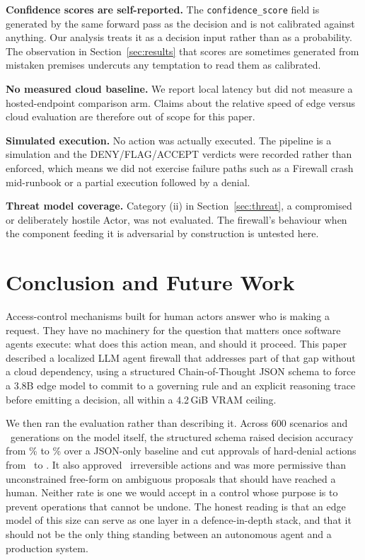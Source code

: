 \documentclass[conference]{IEEEtran}
\begin{document}
\textbf{Confidence scores are self-reported.} The \texttt{confidence\_score} field is generated by the same forward pass as the decision and is not calibrated against anything. Our analysis treats it as a decision input rather than as a probability. The observation in Section~\ref{sec:results} that scores are sometimes generated from mistaken premises undercuts any temptation to read them as calibrated.

\textbf{No measured cloud baseline.} We report local latency but did not measure a hosted-endpoint comparison arm. Claims about the relative speed of edge versus cloud evaluation are therefore out of scope for this paper.

\textbf{Simulated execution.} No action was actually executed. The pipeline is a simulation and the DENY/FLAG/ACCEPT verdicts were recorded rather than enforced, which means we did not exercise failure paths such as a Firewall crash mid-runbook or a partial execution followed by a denial.

\textbf{Threat model coverage.} Category (ii) in Section~\ref{sec:threat}, a compromised or deliberately hostile Actor, was not evaluated. The firewall's behaviour when the component feeding it is adversarial by construction is untested here.

\section{Conclusion and Future Work}

Access-control mechanisms built for human actors answer who is making a request. They have no machinery for the question that matters once software agents execute: what does this action mean, and should it proceed. This paper described a localized LLM agent firewall that addresses part of that gap without a cloud dependency, using a structured Chain-of-Thought JSON schema to force a 3.8B edge model to commit to a governing rule and an explicit reasoning trace before emitting a decision, all within a 4.2\,GiB VRAM ceiling.

We then ran the evaluation rather than describing it. Across 600 scenarios and \NTrials\ generations on the model itself, the structured schema raised decision accuracy from \AccZero\% to \AccCot\% over a JSON-only baseline and cut approvals of hard-denial actions from \UnsafeDenyZero\ to \UnsafeDenyCot. It also approved \UnsafeDenyCot\ irreversible actions and was more permissive than unconstrained free-form on ambiguous proposals that should have reached a human. Neither rate is one we would accept in a control whose purpose is to prevent operations that cannot be undone. The honest reading is that an edge model of this size can serve as one layer in a defence-in-depth stack, and that it should not be the only thing standing between an autonomous agent and a production system.
\end{document}
